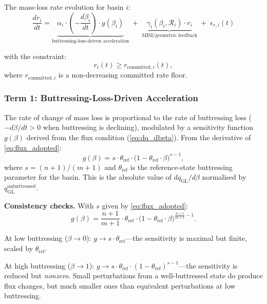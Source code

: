 \documentclass[11pt]{article}
\theoremstyle{definition}
\begin{document}
The mass-loss rate evolution for basin $i$:
\begin{equation}
  \boxed{
  \frac{dr_i}{dt} = \underbrace{\alpha_i \cdot \left(-\frac{d\beta_i}{dt}\right) \cdot g(\beta_i)}_{\text{buttressing-loss-driven acceleration}}
  \;+\; \underbrace{\gamma_i(\beta_i, \mathcal{R}_i) \cdot r_i}_{\text{MISI/geometric feedback}}
  \;+\; \epsilon_{r,i}(t)
  }
  \label{eq:dr_dt}
\end{equation}

with the constraint:
\begin{equation}
  r_i(t) \geq r_{\text{committed},i}(t),
  \label{eq:committed_floor}
\end{equation}
where $r_{\text{committed},i}$ is a non-decreasing committed rate floor.

\subsubsection{Term 1: Buttressing-Loss-Driven Acceleration}

The rate of change of mass loss is proportional to the rate of buttressing loss ($-d\beta/dt > 0$ when buttressing is declining), modulated by a sensitivity function $g(\beta)$ derived from the flux condition (\cref{eq:dq_dbeta}).  From the derivative of \cref{eq:flux_adopted}:
\begin{equation}
  g(\beta) = s \cdot \theta_{\text{ref}} \cdot \bigl(1 - \theta_{\text{ref}} \cdot \beta\bigr)^{s - 1},
  \label{eq:g_beta}
\end{equation}
where $s = (n+1)/(m+1)$ and $\theta_{\text{ref}}$ is the reference-state buttressing parameter for the basin.  This is the absolute value of $dq_\text{GL}/d\beta$ normalised by $q_\text{GL}^{\text{unbuttressed}}$.

\textbf{Consistency checks.}  With $s$ given by \cref{eq:flux_adopted}:
\begin{equation}
  g(\beta) = \frac{n+1}{m+1} \cdot \theta_{\text{ref}} \cdot \bigl(1 - \theta_{\text{ref}} \cdot \beta\bigr)^{\frac{n+1}{m+1} - 1}.
  \label{eq:g_beta_explicit}
\end{equation}

At low buttressing ($\beta \to 0$): $g \to s \cdot \theta_{\text{ref}}$---the sensitivity is maximal but finite, scaled by $\theta_{\text{ref}}$.

At high buttressing ($\beta \to 1$): $g \to s \cdot \theta_{\text{ref}} \cdot (1 - \theta_{\text{ref}})^{s-1}$---the sensitivity is reduced but \emph{nonzero}.  Small perturbations from a well-buttressed state do produce flux changes, but much smaller ones than equivalent perturbations at low buttressing.
\end{document}
